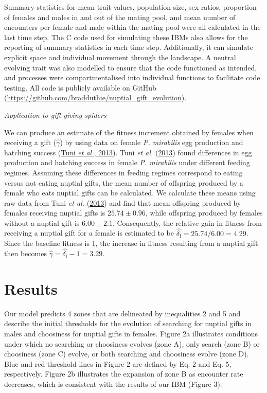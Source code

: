 \documentclass[
]{article}
\begin{document}
Summary statistics for mean trait values, population size, sex ratios,
proportion of females and males in and out of the mating pool, and mean
number of encounters per female and male within the mating pool were all
calculated in the last time step. The C code used for simulating these
IBMs also allows for the reporting of summary statistics in each time
step. Additionally, it can simulate explicit space and individual
movement through the landscape. A neutral evolving trait was also
modelled to ensure that the code functioned as intended, and processes
were compartmentalised into individual functions to facilitate code
testing. All code is publicly available on GitHub
(\url{https://github.com/bradduthie/nuptial_gift_evolution}).

\emph{Application to gift-giving spiders}

We can produce an estimate of the fitness increment obtained by females
when receiving a gift (\(\hat{\gamma}\)) by using data on female
\emph{P. mirabilis} egg production and hatching success
(\protect\hyperlink{ref-Tuni2013a}{Tuni \emph{et al.}, 2013}). Tuni
\emph{et al.} (\protect\hyperlink{ref-Tuni2013a}{2013}) found
differences in egg production and hatching success in female \emph{P.
mirabilis} under different feeding regimes. Assuming these differences
in feeding regimes correspond to eating versus not eating nuptial gifts,
the mean number of offspring produced by a female who eats nuptial gifts
can be calculated. We calculate these means using raw data from Tuni
\emph{et al.} (\protect\hyperlink{ref-Tuni2013a}{2013}) and find that
mean offspring produced by females receiving nuptial gifts is
\(25.74 \pm 0.96\), while offspring produced by females without a
nuptial gift is \(6.00 \pm 2.1\). Consequently, the relative gain in
fitness from receiving a nuptial gift for a female is estimated to be
\(\hat{\delta_\mathrm{f}} = 25.74 / 6.00 = 4.29\). Since the baseline
fitness is 1, the increase in fitness resulting from a nuptial gift then
becomes \(\hat{\gamma} = \hat{\delta_{\mathrm{f}}} - 1 = 3.29.\)

\hypertarget{results}{%
\section{Results}\label{results}}

Our model predicts 4 zones that are delineated by inequalities 2 and 5
and describe the initial thresholds for the evolution of searching for
nuptial gifts in males and choosiness for nuptial gifts in females.
Figure 2a illustrates conditions under which no searching or choosiness
evolves (zone A), only search (zone B) or choosiness (zone C) evolve, or
both searching and choosiness evolve (zone D). Blue and red threshold
lines in Figure 2 are defined by Eq. 2 and Eq. 5, respectively. Figure
2b illustrates the expansion of zone B as encounter rate decreases,
which is consistent with the results of our IBM (Figure 3).
\end{document}
